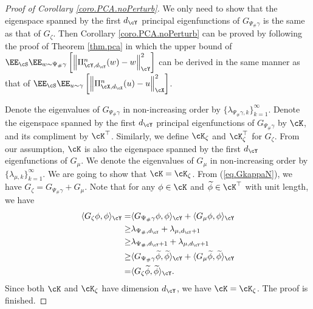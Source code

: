 \documentclass[11pt]{article} %
\begin{document}
\begin{proof}[Proof of Corollary \ref{coro.PCA.noPerturb}]
	We only need to show that the eigenspace spanned by the first $d_{\cY}$ principal eigenfunctions of $G_{\Psi_{\#}\gamma}$ is the same as that of $G_{\zeta}$. Then Corollary \ref{coro.PCA.noPerturb} can be proved by following the proof of Theorem \ref{thm.pca} in which the upper bound of  $\EE_{\cS}\EE_{w\sim \Psi_{\#}\gamma}\left[\left\|\Pi_{\cY,d_{\cY}}^n(w)- w\right\|_{\cY}^2\right]$ can be derived in the same manner as that of  $\EE_{\cS}\EE_{u\sim \gamma}\left[\left\|\Pi_{\cX,d_{\cX}}^n(u)- u\right\|_{\cX}^2\right]$. 
	
	Denote the eigenvalues of $G_{\Psi_{\#}\gamma}$ in non-increasing order by $\{\lambda_{\Psi_{\#}\gamma,k}\}_{k=1}^{\infty}$. Denote the eigenspace spanned by the first $d_{\cY}$ principal eigenfunctions of $G_{\Psi_{\#}\gamma}$ by $\cK$, and its compliment by $\cK^{\top}$. Similarly, we define $\cK_{\zeta}$ and $\cK_{\zeta}^{\top}$ for $G_{\zeta}$. From our assumption, $\cK$ is also the eigenspace spanned by the first $d_{\cY}$ eigenfunctions of $G_{\mu}$. We denote the eigenvalues of $G_{\mu}$ in non-increasing order by $\{\lambda_{\mu,k}\}_{k=1}^{\infty}$. We are going to show that $\cK=\cK_{\zeta}$. From (\ref{eq.GkappaN}), we have  $G_{\zeta}=G_{\Psi_{\#}\gamma}+G_{\mu}$. Note that for any $\phi\in \cK$ and $\widetilde{\phi}\in \cK^{\top}$ with unit length, we have
	\begin{align*}
		\langle G_{\zeta}\phi,\phi \rangle_{\cY}=&\langle G_{\Psi_{\#}\gamma}\phi,\phi\rangle_{\cY}+ \langle G_{\mu}\phi,\phi \rangle_{\cY} \\
		\geq &\lambda_{\Psi_{\#},d_{\cY}}+\lambda_{\mu,d_{\cY}+1}\\
		\geq & \lambda_{\Psi_{\#},d_{\cY}+1}+\lambda_{\mu,d_{\cY}+1}\\
		\geq &\langle G_{\Psi_{\#}\gamma}\widetilde{\phi},\widetilde{\phi}\rangle_{\cY}+ \langle G_{\mu}\widetilde{\phi},\widetilde{\phi} \rangle_{\cY} \\
		=&\langle G_{\zeta}\widetilde{\phi},\widetilde{\phi}\rangle_{\cY}.
	\end{align*} 
	Since both $\cK$ and $\cK_{\zeta}$ have dimension $d_{\cY}$, we have $\cK=\cK_{\zeta}$. The proof is finished.
\end{proof}
\end{document}
